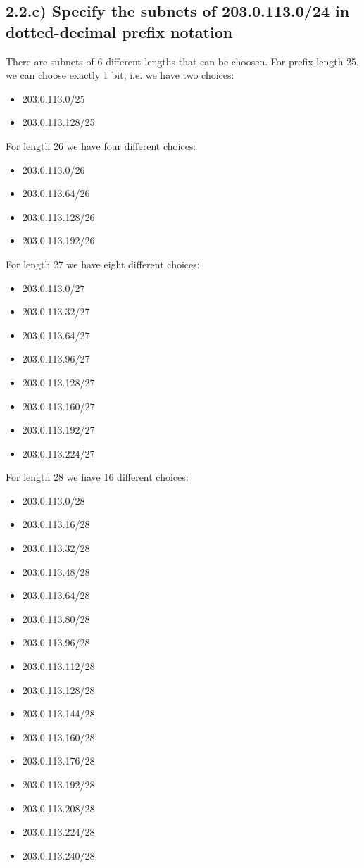 \documentclass[a4paper,10pt]{article}
\begin{document}
\subsection{2.2.c) Specify the subnets of 203.0.113.0/24 in dotted-decimal prefix notation}
There are subnets of 6 different lengths that can be choosen. For prefix length 25, we can choose exactly 1 bit, i.e. we have two choices:
\begin{itemize}
  \item 203.0.113.0/25
  \item 203.0.113.128/25
\end{itemize}
For length 26 we have four different choices:
\begin{itemize}
  \item 203.0.113.0/26
  \item 203.0.113.64/26
  \item 203.0.113.128/26
  \item 203.0.113.192/26
\end{itemize}
For length 27 we have eight different choices:
\begin{itemize}
  \item 203.0.113.0/27
  \item 203.0.113.32/27
  \item 203.0.113.64/27
  \item 203.0.113.96/27
  \item 203.0.113.128/27
  \item 203.0.113.160/27
  \item 203.0.113.192/27
  \item 203.0.113.224/27
\end{itemize}
For length 28 we have 16 different choices:
\begin{itemize}
  \item 203.0.113.0/28
  \item 203.0.113.16/28
  \item 203.0.113.32/28
  \item 203.0.113.48/28
  \item 203.0.113.64/28
  \item 203.0.113.80/28
  \item 203.0.113.96/28
  \item 203.0.113.112/28
  \item 203.0.113.128/28
  \item 203.0.113.144/28
  \item 203.0.113.160/28
  \item 203.0.113.176/28
  \item 203.0.113.192/28
  \item 203.0.113.208/28
  \item 203.0.113.224/28
  \item 203.0.113.240/28
\end{itemize}
\end{document}
